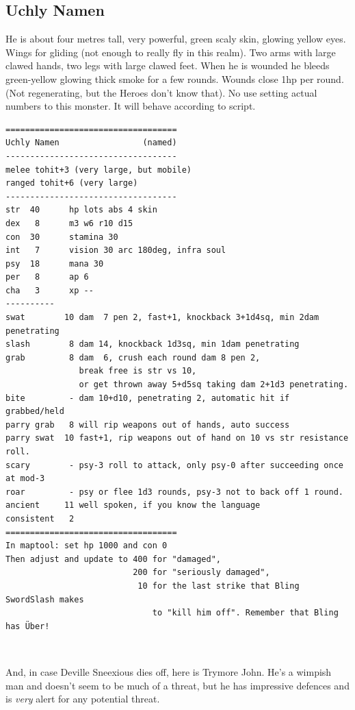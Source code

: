 \subsection*{Uchly Namen}
He is about four metres tall, very powerful, green scaly skin, glowing yellow eyes. Wings for gliding (not enough to really fly in this realm). Two arms with large clawed hands, two legs with large clawed feet.
When he is wounded he bleeds green-yellow glowing thick smoke for a few rounds. Wounds close 1hp per round. (Not regenerating, but the Heroes don't know that).
No use setting actual numbers to this monster. It will behave according to script.

\raggedbottom

\goodbreak \begin{samepage} \small \begin{verbatim}
===================================
Uchly Namen                 (named)
-----------------------------------
melee tohit+3 (very large, but mobile)
ranged tohit+6 (very large)
-----------------------------------
str  40      hp lots abs 4 skin
dex   8      m3 w6 r10 d15
con  30      stamina 30
int   7      vision 30 arc 180deg, infra soul
psy  18      mana 30
per   8      ap 6
cha   3      xp --
----------
swat        10 dam  7 pen 2, fast+1, knockback 3+1d4sq, min 2dam penetrating
slash        8 dam 14, knockback 1d3sq, min 1dam penetrating
grab         8 dam  6, crush each round dam 8 pen 2,
               break free is str vs 10,
               or get thrown away 5+d5sq taking dam 2+1d3 penetrating.
bite         - dam 10+d10, penetrating 2, automatic hit if grabbed/held
parry grab   8 will rip weapons out of hands, auto success
parry swat  10 fast+1, rip weapons out of hand on 10 vs str resistance roll.
scary        - psy-3 roll to attack, only psy-0 after succeeding once at mod-3
roar         - psy or flee 1d3 rounds, psy-3 not to back off 1 round.
ancient     11 well spoken, if you know the language
consistent   2
===================================
In maptool: set hp 1000 and con 0
Then adjust and update to 400 for "damaged",
                          200 for "seriously damaged",
                           10 for the last strike that Bling SwordSlash makes
                              to "kill him off". Remember that Bling has Über!
\end{verbatim} \normalsize \end{samepage}

\

And, in case Deville Sneexious dies off, here is Trymore John. He's a wimpish man and doesn't seem to be much of a threat, but he has impressive defences and is \emph{very} alert for any potential threat.

